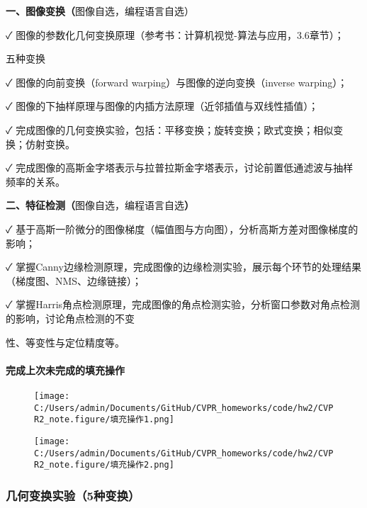 \documentclass[
]{article}
\author{}
\date{}
\begin{document}
\textbf{⼀、图像变换（}图像⾃选，编程语⾔⾃选）

✓ 图像的参数化⼏何变换原理（参考书：计算机视觉-算法与应⽤，3.6章节）；

五种变换

✓ 图像的向前变换（forward warping）与图像的逆向变换（inverse warping）；

✓ 图像的下抽样原理与图像的内插⽅法原理（近邻插值与双线性插值）；

✓
完成图像的⼏何变换实验，包括：平移变换；旋转变换；欧式变换；相似变换；仿射变换。

✓
完成图像的⾼斯⾦字塔表示与拉普拉斯⾦字塔表示，讨论前置低通滤波与抽样频率的关系。

\textbf{⼆、特征检测（}图像⾃选，编程语⾔⾃选\textbf{）}

✓
基于⾼斯⼀阶微分的图像梯度（幅值图与⽅向图），分析⾼斯⽅差对图像梯度的影响；

✓
掌握Canny边缘检测原理，完成图像的边缘检测实验，展示每个环节的处理结果（梯度图、NMS、边缘链接）；

✓
掌握Harris⻆点检测原理，完成图像的⻆点检测实验，分析窗⼝参数对⻆点检测的影响，讨论⻆点检测的不变

性、等变性与定位精度等。

\hypertarget{ux5b8cux6210ux4e0aux6b21ux672aux5b8cux6210ux7684ux586bux5145ux64cdux4f5c}{%
\paragraph{完成上次未完成的填充操作}\label{ux5b8cux6210ux4e0aux6b21ux672aux5b8cux6210ux7684ux586bux5145ux64cdux4f5c}}

\begin{figure}
\centering
\texttt{[image: C:/Users/admin/Documents/GitHub/CVPR\_homeworks/code/hw2/CVPR2\_note.figure/填充操作1.png]}
\caption{}
\end{figure}

\begin{figure}
\centering
\texttt{[image: C:/Users/admin/Documents/GitHub/CVPR\_homeworks/code/hw2/CVPR2\_note.figure/填充操作2.png]}
\caption{}
\end{figure}

\hypertarget{ux51e0ux4f55ux53d8ux6362ux5b9eux9a8c5ux79cdux53d8ux6362uxff09}{%
\subsubsection{几何变换实验（5种变换）}\label{ux51e0ux4f55ux53d8ux6362ux5b9eux9a8c5ux79cdux53d8ux6362uxff09}}
\end{document}
